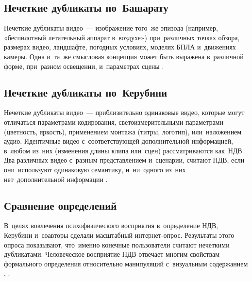 \subsection{Нечеткие дубликаты по~Башарату}

Нечеткие дубликаты видео~— изображение того~же эпизода
(например, «беспилотный летательный аппарат в~воздухе») при~различных точках обзора,
размерах видео, ландшафте, погодных условиях, моделях БПЛА и~движениях камеры.
Одна и~та~же смысловая концепция может
быть выражена в~различной форме, при~разном освещении,
и~параметрах сцены \cite{Basharat:2008}.




\subsection{Нечеткие дубликаты по~Керубини}

Нечеткие дубликаты видео~— приблизительно одинаковые видео,
которые могут отличаться параметрами кодирования,
светоизмерительными параметрами (цветность, яркость),
применением монтажа (титры, логотип), или~наложением  аудио.
Идентичные видео с~соответствующей дополнительной информацией,
в~любом из~них (изменения длины клипа или~сцен) рассматриваются как~НДВ.
Два различных видео с~разным представлением и~сценарии,
считают НДВ, если они~используют одинаковую семантику,
и~ни~одного из~них нет~дополнительной информации \cite{Cherubini:2009}.


\subsection{Сравнение определений}


В~целях вовлечения психофизического восприятия в~определение НДВ,
Керубини и~соавторы \cite{Cherubini:2009} сделали масштабный интернет-опрос.
Результаты этого опроса показывают, что~именно конечные пользователи
считают нечеткими дубликатами.
Человеческое восприятие НДВ отвечает
многим свойствам формального определения
относительно манипуляций с~визуальным содержанием
\cite{Wu:2007a}, \cite{Shen:2007}.

